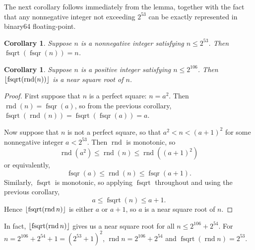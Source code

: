 \documentclass[a4paper]{article}
\DeclarePairedDelimiter\floor{\lfloor}{\rfloor}
\DeclareMathOperator{\rnd}{rnd}
\DeclareMathOperator{\fsqrt}{fsqrt}
\DeclareMathOperator{\fsqr}{fsqr}
\theoremstyle{plain}
\newtheorem{corollary}[theorem]{Corollary}
\theoremstyle{definition}
\begin{document}
The next corollary follows immediately from the lemma, together with the
fact that any nonnegative integer not exceeding $2^{53}$ can be exactly
represented in binary64 floating-point.

\begin{corollary}
  Suppose $n$ is a nonnegative integer satisfying $n \le 2^{53}$. Then
  $\fsqrt(\fsqr(n)) = n$.
\end{corollary}

\begin{corollary}
  Suppose $n$ is a positive integer satisfying $n \le 2^{106}$. Then
  $\floor{\fsqrt(\rnd(n))}$ is a near square root of $n$.
\end{corollary}

\begin{proof}
  First suppose that $n$ is a perfect square: $n = a^2$. Then $\rnd(n) =
  \fsqr(a)$, so from the previous corollary, $\fsqrt(\rnd(n)) =
  \fsqrt(\fsqr(a)) = a$.

  Now suppose that $n$ is not a perfect square, so that $a^2 < n < (a+1)^2$
  for some nonnegative integer $a < 2^{53}$. Then $\rnd$ is monotonic, so
    $$\rnd(a^2) \le \rnd(n) \le \rnd((a+1)^2)$$
  or equivalently,
    $$\fsqr(a) \le \rnd(n) \le \fsqr(a+1).$$
  Similarly, $\fsqrt$ is monotonic, so applying $\fsqrt$ throughout
  and using the previous corollary,
    $$a \le \fsqrt(n) \le a + 1.$$
  Hence $\floor{\fsqrt(\rnd n)}$ is either $a$ or $a+1$, so $a$ is a near
  square root of $n$.
\end{proof}

In fact, $\floor{\fsqrt(\rnd n)}$ gives us a near square root for all
$n \le 2^{106} + 2^{54}$. For $n = 2^{106} + 2^{54} + 1 = (2^{53} + 1)^2$,
$\rnd n = 2^{106} + 2^{54}$ and $\fsqrt(\rnd n) = 2^{53}$.


\end{document}
